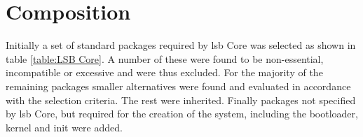 \section{Composition}\label{Composition}

Initially a set of standard packages required by \gls{lsb} Core was selected as shown in table \ref{table:LSB Core}. A number of these were found to be non-essential, incompatible or excessive and were thus excluded. For the majority of the remaining packages smaller alternatives were found and evaluated in accordance with the selection criteria. The rest were inherited. Finally packages not specified by \gls{lsb} Core, but required for the creation of the system, including the bootloader, kernel and init were added.

\newpage

\newpage

\newpage

